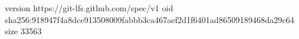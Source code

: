 version https://git-lfs.github.com/spec/v1
oid sha256:918947f4a8dce913508009fabbb3ca467aef2d1f6401ad86509189468da29c64
size 33563

